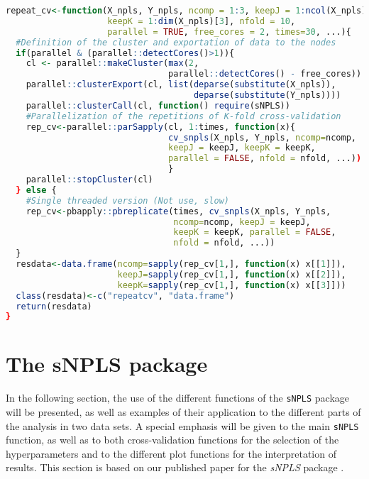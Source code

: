 \vspace{12pt}
\begin{lstlisting}[language=R, deletekeywords={scale, !=, <-, !, Q, qf, names, max, var, drop, se, search.grid, mean, grid, search, rep, repeat}, otherkeywords={}, morekeywords={unfold3w, pbreplicate, parSapply}, caption=Repeated cross validation function]
repeat_cv<-function(X_npls, Y_npls, ncomp = 1:3, keepJ = 1:ncol(X_npls), 
                    keepK = 1:dim(X_npls)[3], nfold = 10, 
                    parallel = TRUE, free_cores = 2, times=30, ...){
  #Definition of the cluster and exportation of data to the nodes
  if(parallel & (parallel::detectCores()>1)){
    cl <- parallel::makeCluster(max(2, 
                                parallel::detectCores() - free_cores))
    parallel::clusterExport(cl, list(deparse(substitute(X_npls)), 
                                     deparse(substitute(Y_npls))))
    parallel::clusterCall(cl, function() require(sNPLS))
    #Parallelization of the repetitions of K-fold cross-validation
    rep_cv<-parallel::parSapply(cl, 1:times, function(x){
                                cv_snpls(X_npls, Y_npls, ncomp=ncomp, 
                                keepJ = keepJ, keepK = keepK, 
                                parallel = FALSE, nfold = nfold, ...))
                                }
    parallel::stopCluster(cl)
  } else {
    #Single threaded version (Not use, slow)
    rep_cv<-pbapply::pbreplicate(times, cv_snpls(X_npls, Y_npls, 
                                 ncomp=ncomp, keepJ = keepJ, 
                                 keepK = keepK, parallel = FALSE, 
                                 nfold = nfold, ...))
  }
  resdata<-data.frame(ncomp=sapply(rep_cv[1,], function(x) x[[1]]), 
                      keepJ=sapply(rep_cv[1,], function(x) x[[2]]),
                      keepK=sapply(rep_cv[1,], function(x) x[[3]]))
  class(resdata)<-c("repeatcv", "data.frame")
  return(resdata)
}
\end{lstlisting}

\section{The sNPLS package}
In the following section, the use of the different functions of the \texttt{sNPLS} package will be presented, as well as examples of their application to the different parts of the analysis in two data sets. A special emphasis will be given to the main \texttt{sNPLS} function, as well as to both cross-validation functions for the selection of the hyperparameters and to the different plot functions for the interpretation of results. This section is based on our published paper for the \textit{sNPLS} package \parencite{hervas2018sparse}.

